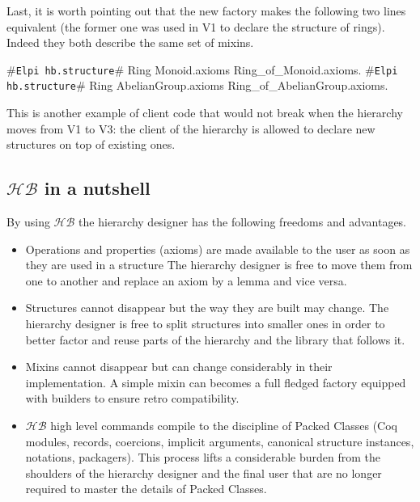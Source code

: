 \documentclass[a4paper,UKenglish,cleveref, autoref]{lipics-v2019}
\newcommand{\HB}{\ensuremath{\mathcal{HB}}}
\newcommand{\mixin}{mixin}
\newcommand{\mixins}{mixins}
\newcommand{\Mixins}{Mixins}
\newcommand{\factory}{factory}
\newcommand{\packager}{packager}
\newcommand{\builder}{builder}
\newcommand{\hbstructure}{{\tt\color{dkgreen}Elpi hb.structure}}
\theoremstyle{implem}
\theoremstyle{implem}
\theoremstyle{command}
\begin{document}
Last, it is worth pointing out that the new factory makes the following
two lines equivalent (the former one was used in V1 to declare
the structure of rings). Indeed they both describe the same set of \mixins{}.

\begin{coqcode}
#\hbstructure{}# Ring Monoid.axioms Ring_of_Monoid.axioms.
#\hbstructure{}# Ring AbelianGroup.axioms Ring_of_AbelianGroup.axioms.
\end{coqcode}

This is another example of client code that would not break when the hierarchy
moves from V1 to V3: the client of the hierarchy is allowed to declare new
structures on top of existing ones.

\subsection{\HB{} in a nutshell}

By using \HB{} the hierarchy designer has the following freedoms and advantages.

\begin{itemize}
\item Operations and properties (axioms) are made available to the user
      as soon as they are used in a structure The hierarchy designer
      is free to move them from one to another and replace an axiom
      by a lemma and vice versa.
\item Structures cannot disappear but the way they are built may change.
      The hierarchy designer is free to split structures into smaller
      ones in order to better factor and reuse parts of the hierarchy
      and the library that follows it.
\item \Mixins{} cannot disappear but can change considerably
      in their implementation. A simple \mixin{} can becomes a full fledged
      \factory{} equipped with \builder{}s to ensure retro compatibility.
\item \HB{} high level commands compile to
      the discipline of Packed Classes (Coq modules, records, coercions,
      implicit arguments, canonical structure instances, notations,
      \packager{}s).
      This process lifts a considerable
      burden from the shoulders of the hierarchy designer and the final user
      that are no longer required to master the details of Packed Classes.
\end{itemize}

\end{document}

